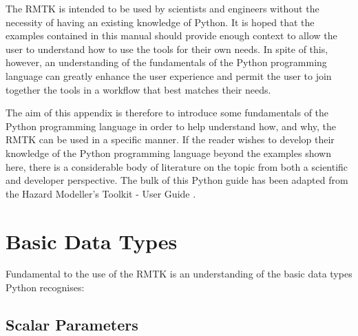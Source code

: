 The RMTK is intended to be used by scientists and engineers without the necessity of having an existing knowledge of Python. It is hoped that the examples contained in this manual should provide enough context to allow the user to understand how to use the tools for their own needs. In spite of this, however, an understanding of the fundamentals of the Python programming language can greatly enhance the user experience and permit the user to join together the tools in a workflow that best matches their needs.

The aim of this appendix is therefore to introduce some fundamentals of the Python programming language in order to help understand how, and why, the RMTK can be used in a specific manner. If the reader wishes to develop their knowledge of the Python programming language beyond the examples shown here, there is a considerable body of literature on the topic from both a scientific and developer perspective. The bulk of this Python guide has been adapted from the Hazard Modeller's Toolkit - User Guide \citep{hmtk_guide}.

\section{Basic Data Types}

Fundamental to the use of the RMTK is an understanding of the basic data types Python recognises:


\subsection{Scalar Parameters}

